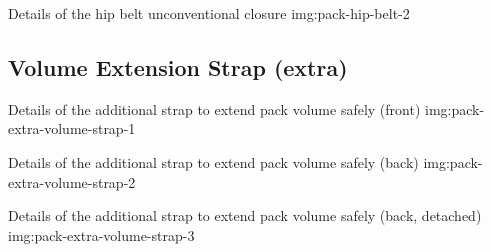 {Details of the hip belt unconventional closure}
{img:pack-hip-belt-2}

\subsection{Volume Extension Strap (extra)}

{Details of the additional strap to extend pack volume safely (front)}
{img:pack-extra-volume-strap-1}

{Details of the additional strap to extend pack volume safely (back)}
{img:pack-extra-volume-strap-2}

{Details of the additional strap to extend pack volume safely (back, detached)}
{img:pack-extra-volume-strap-3}
